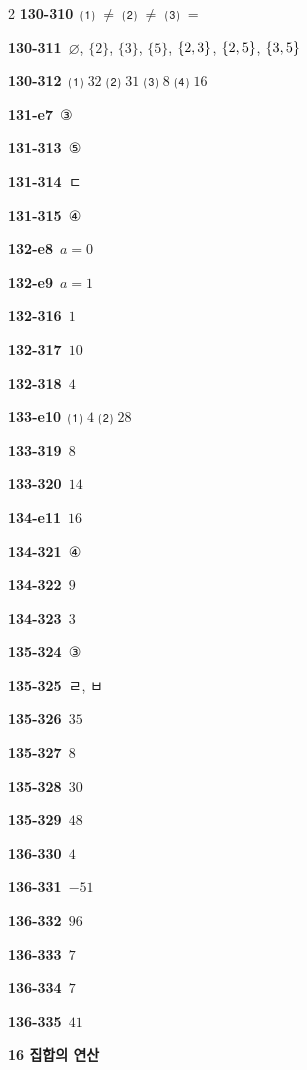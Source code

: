 \documentclass[10pt,a4paper]{article}
\begin{document}
\begin{multicols}{2}
\noindent\textbf{130-310}\ ⑴ $\ne$ ⑵ $\ne$ ⑶ $=$\par
\noindent\textbf{130-311}\ $\varnothing$, $\{2\}$, $\{3\}$, $\{5\}$, $\{2{,}\mkern3mu\mathopen{}3\}$, $\{2{,}\mkern3mu\mathopen{}5\}$, $\{3{,}\mkern3mu\mathopen{}5\}$\par
\noindent\textbf{130-312}\ ⑴ $32$ ⑵ $31$ ⑶ $8$ ⑷ $16$\par
\noindent\textbf{131-e7}\ ③\par
\noindent\textbf{131-313}\ ⑤\par
\noindent\textbf{131-314}\ ㄷ\par
\noindent\textbf{131-315}\ ④\par
\noindent\textbf{132-e8}\ $a=0$\par
\noindent\textbf{132-e9}\ $a=1$\par
\noindent\textbf{132-316}\ $1$\par
\noindent\textbf{132-317}\ $10$\par
\noindent\textbf{132-318}\ $4$\par
\noindent\textbf{133-e10}\ ⑴ $4$ ⑵ $28$\par
\noindent\textbf{133-319}\ $8$\par
\noindent\textbf{133-320}\ $14$\par
\noindent\textbf{134-e11}\ $16$\par
\noindent\textbf{134-321}\ ④\par
\noindent\textbf{134-322}\ $9$\par
\noindent\textbf{134-323}\ $3$\par
\noindent\textbf{135-324}\ ③\par
\noindent\textbf{135-325}\ ㄹ, ㅂ\par
\noindent\textbf{135-326}\ $35$\par
\noindent\textbf{135-327}\ $8$\par
\noindent\textbf{135-328}\ $30$\par
\noindent\textbf{135-329}\ $48$\par
\noindent\textbf{136-330}\ $4$\par
\noindent\textbf{136-331}\ $-51$\par
\noindent\textbf{136-332}\ $96$\par
\noindent\textbf{136-333}\ $7$\par
\noindent\textbf{136-334}\ $7$\par
\noindent\textbf{136-335}\ $41$\par
\noindent\textbf{16 집합의 연산}\par\smallskip

\end{multicols}
\end{document}
